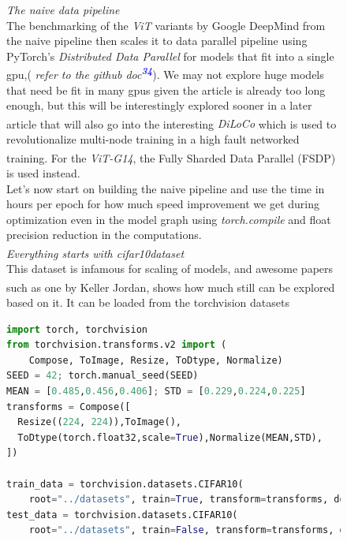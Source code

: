 \documentclass[12pt]{article}
\newcommand{\customtext}[3]{%
    \vspace{#2} %
    \fontsize{13}{8}\textcolor{#1}{\textit{#3}}%
}
\newcommand{\sidecite}[1]{\textsuperscript{\textcolor{blue}{\textbf{\scriptsize#1}}}}
\newcommand{\maincitecount}{\sidecite{\stepcounter{maincite}\themaincite}}
\begin{document}
\begin{figure}[!htb]
    \begin{minipage}[t]{0.65\textwidth}
    \raggedright
    \customtext{xtitle}{0em}{The naive data pipeline}\\
    The benchmarking of the {\it ViT} variants by Google DeepMind from the naive pipeline then 
    scales it to data parallel pipeline using PyTorch's {\it Distributed Data Parallel} for models 
    that fit into a single gpu,( {\it \small refer to the github doc\sidecite{34}}). We may not 
    explore huge models that need be fit in many gpus given the article is already too long 
    enough, but this will be interestingly explored sooner in a later article that will also go 
    into the interesting {\it \small DiLoCo\maincitecount} which is used to revolutionalize 
    multi-node training in a high fault networked training\maincitecount. For the {\it ViT-G14}, 
    the Fully Sharded Data Parallel (FSDP) is used instead.\\
    Let's now start on building the naive pipeline and use the time in hours per epoch for how much 
    speed improvement we get during optimization even in the model graph using {\it torch.compile} and 
    float precision reduction in the computations.\\
    \vspace{1em}
    \customtext{xtitle}{0em}{Everything starts with cifar10\maincitecount dataset}\\
    This dataset is infamous for scaling of models, and awesome papers such as one 
    by Keller Jordan\maincitecount, shows how much still can be explored based on it.
    It can be loaded from the torchvision datasets
\begin{lstlisting}[language=python,style=python,basicstyle=\ttfamily\scriptsize]
import torch, torchvision 
from torchvision.transforms.v2 import (
    Compose, ToImage, Resize, ToDtype, Normalize)
SEED = 42; torch.manual_seed(SEED)
MEAN = [0.485,0.456,0.406]; STD = [0.229,0.224,0.225]
transforms = Compose([
  Resize((224, 224)),ToImage(),
  ToDtype(torch.float32,scale=True),Normalize(MEAN,STD),
])

train_data = torchvision.datasets.CIFAR10(
    root="../datasets", train=True, transform=transforms, download=True)
test_data = torchvision.datasets.CIFAR10(
    root="../datasets", train=False, transform=transforms, download=True)


\end{lstlisting}
\end{minipage}
\end{figure}
\end{document}
